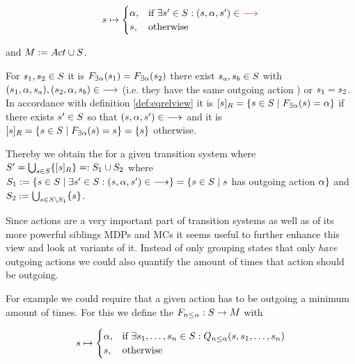 \documentclass[preview]{standalone}
\begin{document}
\[
{s} \mapsto
\begin{cases}
	{\alpha},				& \text{if } \exists {s}' \in {S}: ({s}, {\alpha}, {s}') \in {\color{red}\ensuremath{{\longrightarrow}}} \\
	{s},          	& \text{otherwise}
\end{cases}
\]

and ${{M}} := {{Act} \cup {S}}$.

For ${s}_1,{s}_2 \in {S}$ it is ${{{{F}}_{\exists{\alpha}}}}({s}_1) = {{{{F}}_{\exists{\alpha}}}}({s}_2)$ \iffN 
there exist ${s}_{a},{s}_{b} \in {S}$ with 
$({s}_1, {\alpha}, {s}_{a}), ({s}_2, {\alpha}, {s}_{b}) \in {\longrightarrow}$ (i.e. they have the same outgoing action \action) or ${s}_1 = {s}_2$. 
In accordance with definition \ref{def:eqrelview} it is 
$\eqclassv{\state} = \{\state \in \states \mid \gfcthasoutaction(\state) = \action\}$ if 
there exists ${s}' \in {S}$ so that $({s}, {\alpha}, {s}') \in {\longrightarrow}$ and it is
$\eqclassv{\state} = \{\state \in \states \mid \gfcthasoutaction(\state) = \state\} = \{s\}$ otherwise. %

Thereby we obtain the \viewN \viewhasoutaction for a given transition system \ts where ${S}' = \bigcup_{{s} \in {S}} \{{{[{s}]_{{R}}}}\} =: {S}_1 \cup {S}_2$ where ${S}_1 := \{{s} \in {S} \mid \exists {s}' \in {S}: ({s}, {\alpha}, {s}') \in {\longrightarrow}\} = \{{s} \in {S} \mid {s}$ has outgoing action ${\alpha}\}$ and ${S}_2 := \bigcup_{{s} \in {S} \setminus {S}_1}\{{s}\}$.

Since actions are a very important part of transition systems as well as of its more powerful siblings MDPs and MCs it seems useful to further enhance this view and look at variants of it. Instead of only grouping states that only \emph{have} outgoing actions we could also quantify the amount of times that action should be outgoing.

For example we could require that a given action has to be outgoing a minimum amount of times. For this we define the \grpfctN ${{{{F}}_{{n}\leq{\alpha}}}} : {S} \to {M}$ with

\[
{s} \mapsto
\begin{cases}
	{\alpha},				& \text{if } \exists {s}_1, \dots, {s}_{n} \in {S}:  {Q_{{n}\leq{\alpha}}({s},{s}_1, \dots, {s}_{{n}})}\\
	{s},          	& \text{otherwise}
\end{cases}
\]
\end{document}
